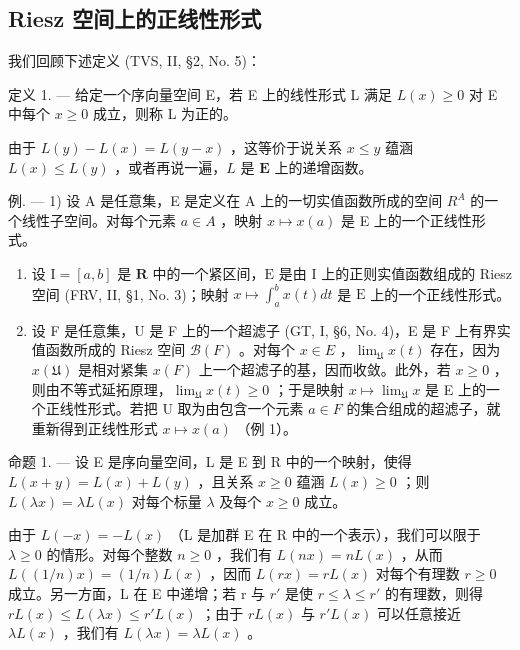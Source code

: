 \subsection{Riesz 空间上的正线性形式}

我们回顾下述定义 (TVS, II, §2, No. 5)：

定义 1. --- 给定一个序向量空间 E，若 E 上的线性形式 L 满足 \(L(x) \geqslant 0\) 对 E 中每个 \(x \geqslant 0\) 成立，则称 L 为正的。

由于 \(L(y) - L(x) = L(y - x)\) ，这等价于说关系 \(x \leqslant y\) 蕴涵 \(L(x) \leqslant L(y)\) ，或者再说一遍，\(L\) 是 \(\mathbf{E}\) 上的递增函数。

例. --- 1) 设 A 是任意集，E 是定义在 A 上的一切实值函数所成的空间 \(R^{A}\) 的一个线性子空间。对每个元素 \(a \in A\) ，映射 \(x \mapsto x(a)\) 是 E 上的一个正线性形式。

\begin{enumerate}
\def\labelenumi{\arabic{enumi})}
\setcounter{enumi}{1}
\item
  设 \(\mathrm{I} = [a, b]\) 是 \(\mathbf{R}\) 中的一个紧区间，\(\mathrm{E}\) 是由 \(\mathrm{I}\) 上的正则实值函数组成的 Riesz 空间 (FRV, II, §1, No. 3)；映射 \(x \mapsto \int_{a}^{b} x(t) dt\) 是 \(\mathrm{E}\) 上的一个正线性形式。
\item
  设 F 是任意集，U 是 F 上的一个超滤子 (GT, I, §6, No. 4)，E 是 F 上有界实值函数所成的 Riesz 空间 \(\mathcal{B}(F)\) 。对每个 \(x \in E\) ，\(\lim_{\mathfrak{U}} x(t)\) 存在，因为 \(x(\mathfrak{U})\) 是相对紧集 \(x(F)\) 上一个超滤子的基，因而收敛。此外，若 \(x \geqslant 0\) ，则由不等式延拓原理，\(\lim_{\mathfrak{U}} x(t) \geqslant 0\) ；于是映射 \(x \mapsto \lim_{\mathfrak{U}} x\) 是 E 上的一个正线性形式。若把 U 取为由包含一个元素 \(a \in F\) 的集合组成的超滤子，就重新得到正线性形式 \(x \mapsto x(a)\) （例 1）。
\end{enumerate}

命题 1. --- 设 E 是序向量空间，L 是 E 到 R 中的一个映射，使得 \(L(x+y)=L(x)+L(y)\) ，且关系 \(x\geqslant0\) 蕴涵 \(L(x)\geqslant0\) ；则 \(L(\lambda x)=\lambda L(x)\) 对每个标量 \(\lambda\) 及每个 \(x\geqslant0\) 成立。

由于 \(L(-x) = -L(x)\) （L 是加群 E 在 R 中的一个表示），我们可以限于 \(\lambda \geqslant 0\) 的情形。对每个整数 \(n \geqslant 0\) ，我们有 \(L(nx) = nL(x)\) ，从而 \(L((1/n)x) = (1/n)L(x)\) ，因而 \(L(rx) = rL(x)\) 对每个有理数 \(r \geqslant 0\) 成立。另一方面，L 在 E 中递增；若 r 与 \(r'\) 是使 \(r \leqslant \lambda \leqslant r'\) 的有理数，则得 \(rL(x) \leqslant L(\lambda x) \leqslant r'L(x)\) ；由于 \(rL(x)\) 与 \(r'L(x)\) 可以任意接近 \(\lambda L(x)\) ，我们有 \(L(\lambda x) = \lambda L(x)\) 。

